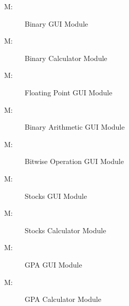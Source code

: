 \documentclass[12pt, titlepage]{article}
\newcounter{mnum}
\newcommand{\mthemnum}{M\themnum}
\begin{document}
\begin{description}
\item [ \mthemnum \label{m23}:] Binary GUI Module
\item [ \mthemnum \label{m24}:] Binary Calculator Module
\item [ \mthemnum \label{m25}:] Floating Point GUI Module
\item [ \mthemnum \label{m26}:] Binary Arithmetic GUI Module
\item [ \mthemnum \label{m27}:] Bitwise Operation GUI Module
\item [ \mthemnum \label{m28}:] Stocks GUI Module
\item [ \mthemnum \label{m29}:] Stocks Calculator Module
\item [ \mthemnum \label{m30}:] GPA GUI Module
\item [ \mthemnum \label{m31}:] GPA Calculator Module

\end{description}
\end{document}
